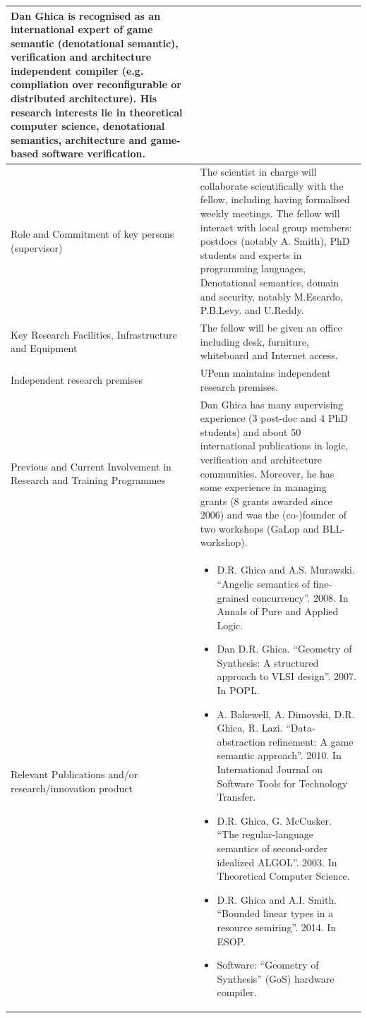 \documentclass{article}[11pt]
\begin{document}
{\begin{tabular}{| l | l |}
{       Dan Ghica is recognised as an international expert of game
       semantic (denotational semantic), verification and architecture independent compiler (e.g. compliation over reconfigurable 
       or distributed architecture). His research interests lie in theoretical computer science, denotational semantics,
       architecture and game-based software verification.
    } \\
    \hline
    \parbox[c]{4cm}{Role and Commitment of key persons (supervisor)} & 
    \parbox[c]{14cm}{
      The scientist in charge will collaborate scientifically with the fellow, including having formalised weekly meetings. The fellow will interact with local group members:  postdocs (notably A. Smith), PhD students and experts in programming languages, Denotational semantics, domain and security, notably M.Escardo, P.B.Levy. and U.Reddy. 
    } \\
    \hline
    \parbox[c]{4cm}{Key  Research  Facilities,   Infrastructure and Equipment} & \parbox[c]{14cm}{The fellow will be given an office including desk, furniture, whiteboard and Internet access.} \\
    \hline
    \parbox[c]{4cm}{Independent research premises} &  \parbox[c]{14cm}{UPenn maintains independent research premises.}\\
    \hline
    \parbox[c]{4cm}{Previous and Current Involvement in Research and Training Programmes} & 
    \parbox[c]{14cm}{Dan Ghica has many supervising experience (3 post-doc and 4 PhD students) and about 50 international publications 
      in logic, verification and architecture communities. Moreover, he has some experience in managing grants (8 grants awarded since 2006) and was the (co-)founder of two workshops (GaLop and BLL-workshop).
    } \\
    \hline
    \parbox[c]{4cm}{Relevant  Publications  and/or\\  research/innovation product} & 
    \parbox[c]{14cm}{
      \begin{itemize}[leftmargin=0.5em, itemsep=0em]
      \item D.R. Ghica and A.S. Murawski. “Angelic semantics of fine-grained concurrency”. 2008. In Annals of Pure and Applied Logic.
      \item Dan D.R. Ghica. “Geometry of Synthesis: A structured approach to VLSI design”. 2007. In POPL.
      \item A. Bakewell, A. Dimovski, D.R. Ghica, R. Lazi. “Data-abstraction refinement: A game semantic approach”. 2010. In International Journal on Software Tools for Technology Transfer.
      \item D.R. Ghica, G. McCusker. “The regular-language semantics of second-order idealized ALGOL”. 2003. In Theoretical Computer Science.
      \item D.R. Ghica and A.I. Smith. ``Bounded linear types in a resource semiring''. 2014. In ESOP.
      \item Software: “Geometry of Synthesis” (GoS) hardware compiler. 
      \end{itemize}
    } \\
    \hline
  \end{tabular}
}
\newpage
\end{document}
